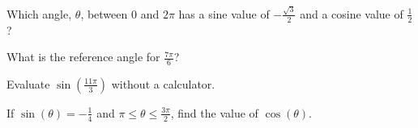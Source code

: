 \begin{myExit}
		Which angle, $\theta$, between $0$ and $2\pi$ has a sine value of $-\frac{\sqrt3}{2}$ and a cosine value of $\frac{1}{2}$?
\end{myExit}
\vfill

\begin{myExit}
		What is the reference angle for $\frac{7\pi}{6}$?
\end{myExit}
\vfill

\begin{myExit}
		Evaluate $\sin(\frac{11\pi}{3})$ without a calculator.
\end{myExit}
\vfill

\begin{myExit}
		If $\sin(\theta)=-\frac{1}{4}$ and $\pi\le\theta\le\frac{3\pi}{2}$, find the value of $\cos(\theta)$.
\end{myExit}
\vfill
\vfill
{}